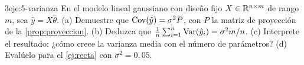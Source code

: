 \begin{ejercicio}{3}{eje:5-varianza}
En el modelo lineal gaussiano con diseño fijo $X\in\mathbb{R}^{n\times m}$ de rango $m$, sea $\hat y=X\hat\theta$. (a) Demuestre que $\operatorname{Cov}(\hat y)=\sigma^{2}P$, con $P$ la matriz de proyección de la \cref{prop:proyeccion}. (b) Deduzca que $\frac1n\sum_{i=1}^{n}\operatorname{Var}(\hat y_i)=\sigma^{2}m/n$. (c) Interprete el resultado: ¿cómo crece la varianza media con el número de parámetros? (d) Evalúelo para el \cref{ej:recta} con $\sigma^{2}=0{,}05$.
\end{ejercicio}
